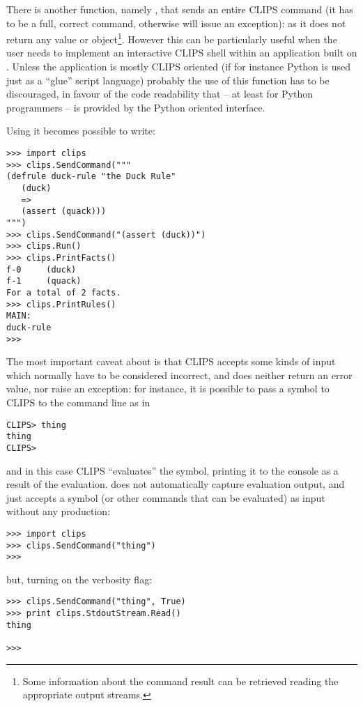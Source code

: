 There is another function, namely , that sends
an entire CLIPS command (it has to be a full, correct command, otherwise
\pyclips{} will issue an exception): as  it does not
return any value or object\footnote{Some information about the command
result can be retrieved reading the appropriate output streams.}.
However this can be particularly useful when the user needs to implement
an interactive CLIPS shell within an application built on \pyclips{}.
Unless the application is mostly CLIPS oriented (if for instance Python
is used just as a ``glue'' script language) probably the use of this
function has to be discouraged, in favour of the code readability that
-- at least for Python programmers -- is provided by the Python oriented
interface.

Using  it becomes possible to write:

\begin{verbatim}
>>> import clips
>>> clips.SendCommand("""
(defrule duck-rule "the Duck Rule"
   (duck)
   =>
   (assert (quack)))
""")
>>> clips.SendCommand("(assert (duck))")
>>> clips.Run()
>>> clips.PrintFacts()
f-0     (duck)
f-1     (quack)
For a total of 2 facts.
>>> clips.PrintRules()
MAIN:
duck-rule
>>>
\end{verbatim}

The most important caveat about  is that CLIPS
accepts some kinds of input which normally have to be considered
incorrect, and \pyclips{} does neither return an error value, nor raise
an exception: for instance, it is possible to pass a symbol to CLIPS to
the command line as in

\begin{verbatim}
CLIPS> thing
thing
CLIPS>
\end{verbatim}

and in this case CLIPS ``evaluates'' the symbol, printing it to the
console as a result of the evaluation. \pyclips{} does not automatically
capture evaluation output, and just accepts a symbol (or other commands
that can be evaluated) as input without any production:

\begin{verbatim}
>>> import clips
>>> clips.SendCommand("thing")
>>>
\end{verbatim}

but, turning on the verbosity flag:

\begin{verbatim}
>>> clips.SendCommand("thing", True)
>>> print clips.StdoutStream.Read()
thing

>>>
\end{verbatim}

